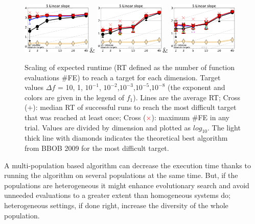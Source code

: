 \documentclass[review]{elsarticle}
\begin{document}
\begin{figure}[h!tb]
\begin{tabular}
  \includegraphics[width=0.30\textwidth]{GAOnly_f005}&
  \includegraphics[width=0.30\textwidth]{PSOOnly_f005}&
  \includegraphics[width=0.30\textwidth]{GAPSO_f005}\\
  \end{tabular}
  \vspace{-3ex}
   \caption{Scaling of expected runtime (RT defined as the number of function 
evaluations \#FE) to reach a target for  
each dimension. Target values $\Delta f$ = 10, 1, $10^{-1}$, $10^{-2}$,$10^{-3}$,$10^{-5}$,$10^{-8}$
(the exponent and colors are given in the legend of $f_1$). 
Lines are the average RT; Cross ($+$): median RT of successful runs to reach
the most difficult target that was reached at least once;
Cross (\textcolor{red}{$\times$}): maximum \#FE in any trial. 
Values are divided by dimension and plotted as $log_{10}$.
The light thick line with diamonds indicates the theoretical best algorithm from BBOB 2009 for the 
most difficult target.
}
\label{fig:bbob}
\end{figure}



A multi-population based algorithm can decrease the execution time
thanks to running the algorithm on several populations at the same
time. But, if the populations are heterogeneous 
it might enhance evolutionary search and avoid unneeded
evaluations to a greater extent than homogeneous systems do; heterogeneous settings, if
done right, increase the diversity of the whole population\cite{araujo2008multikulti}.
\end{document}
